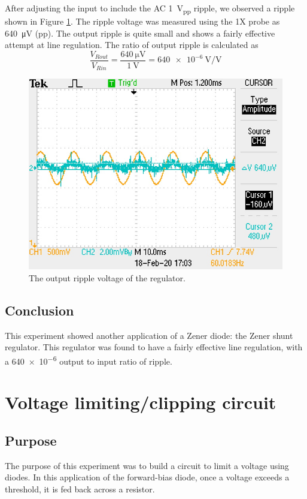 \documentclass{report}
\newcommand{\pp}{_{pp}}
\newcommand{\Vpp}{\V\pp}
\begin{document}
After adjusting the input to include the AC \SI{1}{\Vpp} ripple, we observed a ripple shown in Figure \ref{fig:exp3ripple}. The ripple voltage was measured using the 1X probe as \SI{640}{\uV} (pp). The output ripple is quite small and shows a fairly effective attempt at line regulation. The ratio of output ripple is calculated as
\[ \frac{V_{Rout}}{V_{Rin}} = \frac{\SI{640}{\uV}}{\SI{1}{\V}} = \SI{640e-6}{\V/\V} \]

\begin{figure}[h]
	\centering
	\includegraphics[width=0.4\linewidth]{exp3ripple}
	\caption{The output ripple voltage of the regulator.}
	\label{fig:exp3ripple}
\end{figure}

\subsection{Conclusion}
This experiment showed another application of a Zener diode: the Zener shunt regulator. This regulator was found to have a fairly effective line regulation, with a \num{640e-6} output to input ratio of ripple. 

\pagebreak
\section{Voltage limiting/clipping circuit}

\subsection{Purpose}
The purpose of this experiment was to build a circuit to limit a voltage using diodes. In this application of the forward-bias diode, once a voltage exceeds a threshold, it is fed back across a resistor.
\end{document}
